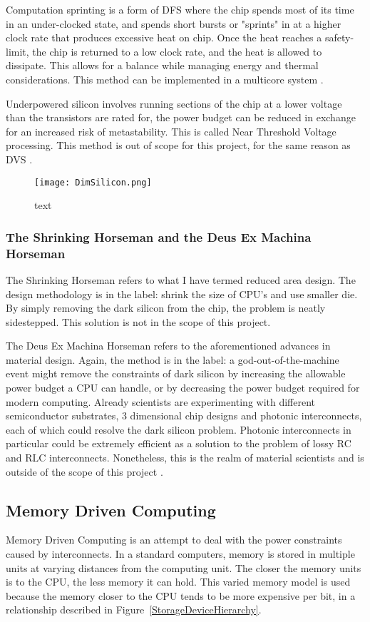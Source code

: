				Computation sprinting is a form of DFS where the chip spends most of its time in an under-clocked state, and spends short bursts or "sprints" in at a higher clock rate that produces excessive heat on chip. Once the heat reaches a safety-limit, the chip is returned to a low clock rate, and the heat is allowed to dissipate. This allows for a balance while managing energy and thermal considerations. This method can be implemented in a multicore system \cite{ComputationalSprinting}.
				
				Underpowered silicon involves running sections of the chip at a lower voltage than the transistors are rated for, the power budget can be reduced in exchange for an increased risk of metastability. This is called Near Threshold Voltage processing. This method is out of scope for this project, for the same reason as DVS \cite{DVS}.
				
				\begin{figure}
					\centering
					\texttt{[image: DimSilicon.png]}
					\caption{text}
					\label{DimSilicon}
				\end{figure}
			
			\subsubsection{The Shrinking Horseman and the Deus Ex Machina Horseman}
				The Shrinking Horseman refers to what I have termed reduced area design. The design methodology is in the label: shrink the size of CPU's and use smaller die. By simply removing the dark silicon from the chip, the problem is neatly sidestepped. This solution is not in the scope of this project.
				
				The Deus Ex Machina Horseman refers to the aforementioned advances in material design. Again, the method is in the label: a god-out-of-the-machine event might remove the constraints of dark silicon by increasing the allowable power budget a CPU can handle, or by decreasing the power budget required for modern computing. Already scientists are experimenting with different semiconductor substrates, 3 dimensional chip designs and photonic interconnects, each of which could resolve the dark silicon problem. Photonic interconnects in particular could be extremely efficient as a solution to the problem of lossy RC and RLC interconnects. Nonetheless, this is the realm of material scientists and is outside of the scope of this project \cite{TheFourHorsemen}.
			
		\subsection{Memory Driven Computing}
			Memory Driven Computing is an attempt to deal with the power constraints caused by interconnects. In a standard computers, memory is stored in multiple units at varying distances from the computing unit. The closer the memory units is to the CPU, the less memory it can hold. This varied memory model is used because the memory closer to the CPU tends to be more expensive per bit, in a relationship described in Figure~\ref{StorageDeviceHierarchy}.
			
